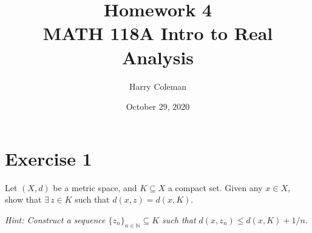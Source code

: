 \documentclass[12pt]{article}
\newenvironment{problem}
    {\begin{lrbox}{\mybox}\begin{minipage}{\textwidth-10pt}}
    {\end{minipage}\end{lrbox}\framebox[6.5in]{\usebox{\mybox}}}
\begin{document}
 
\title{Homework 4\\
    \large MATH 118A Intro to Real Analysis
}
\author{Harry Coleman}
\date{October 29, 2020}
\maketitle

\section*{Exercise 1}
\begin{problem}
    Let $(X,d)$ be a metric space, and $K\subseteq X$ a compact set. Given any $x \in X$, show that $\exists \,z\in K$ such that $d(x,z) = d(x,K)$.

    \noindent
    {\it Hint: Construct a sequence $\{z_n\}_{n \in \mathbb{N}} \subseteq K$ such that $d(x,z_n) \le d(x,K)+1/n$.}
\end{problem}
\end{document}
